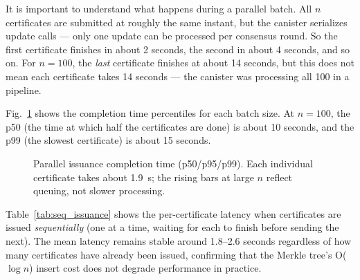 \documentclass[journal]{IEEEtran}
\begin{document}
It is important to understand what happens during a parallel batch. All $n$ certificates are submitted at roughly the same instant, but the canister serializes update calls — only one update can be processed per consensus round. So the first certificate finishes in about 2 seconds, the second in about 4 seconds, and so on. For $n = 100$, the \emph{last} certificate finishes at about 14 seconds, but this does not mean each certificate takes 14 seconds — the canister was processing all 100 in a pipeline.

Fig.~\ref{fig:issuance_perc} shows the completion time percentiles for each batch size. At $n = 100$, the p50 (the time at which half the certificates are done) is about 10 seconds, and the p99 (the slowest certificate) is about 15 seconds.

\begin{figure}[t]
\centering
{}
\caption{Parallel issuance completion time (p50/p95/p99). Each individual certificate takes about 1.9~s; the rising bars at large $n$ reflect queuing, not slower processing.}
\label{fig:issuance_perc}
\end{figure}

Table~\ref{tab:seq_issuance} shows the per-certificate latency when certificates are issued \emph{sequentially} (one at a time, waiting for each to finish before sending the next). The mean latency remains stable around 1.8--2.6 seconds regardless of how many certificates have already been issued, confirming that the Merkle tree's O($\log n$) insert cost does not degrade performance in practice.
\end{document}

